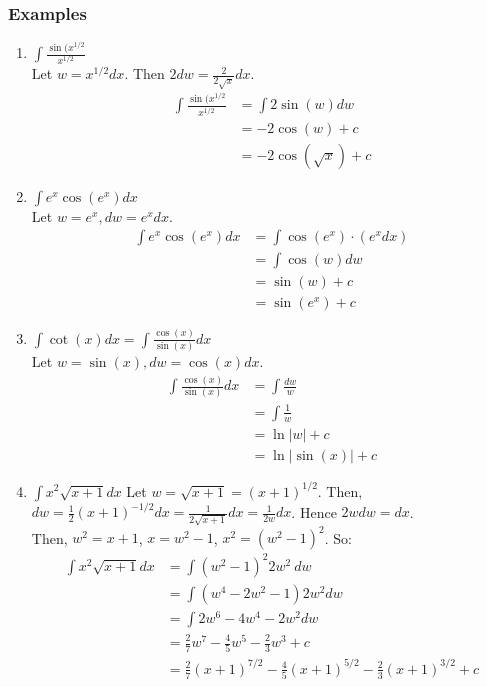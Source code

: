 \documentclass{article}
\begin{document}
\subsubsection{Examples}
\begin{enumerate}
    \item $\int \frac{\sin(x^{1/2}}{x^{1/2}}$\\
    Let $w = x^{1/2} dx$. Then $2dw = \frac{2}{2\sqrt{x}} dx$.
    \begin{align*}
        \int \frac{\sin(x^{1/2}}{x^{1/2}} & = \int 2 \sin(w) dw\\
        & = -2 \cos(w) + c\\
        & = -2 \cos(\sqrt{x}) + c
    \end{align*}
    
    \item $\int e^x \cos(e^x) dx$\\
    Let $w = e^x, dw = e^x dx$.
    \begin{align*}
        \int e^x \cos(e^x) dx & = \int \cos(e^x) \cdot (e^x dx)\\
        & = \int \cos(w) dw\\
        & = \sin(w) + c\\
        & = \sin(e^x) + c
    \end{align*}
    
    \item $\int \cot(x) dx = \int \frac{\cos(x)}{\sin(x)} dx$\\
    Let $w = \sin(x), dw = \cos(x) dx$.
    \begin{align*}
        \int \frac{\cos(x)}{\sin(x)} dx & = \int \frac{dw}{w}\\
        & = \int \frac{1}{w}\\
        & = \ln|w| +c\\
        & = \ln|\sin(x)| +c
    \end{align*}
    
    \item $\int x^2\sqrt{x + 1} dx$
    Let $w = \sqrt{x + 1} = (x+1)^{1/2}$. Then, $dw = \frac{1}{2}(x+1)^{-1/2} dx = \frac{1}{2\sqrt{x+1}} dx = \frac{1}{2w} dx$. Hence $2wdw = dx$.\\
    Then, $w^2 = x + 1$, $x = w^2 -1$, $x^2 = (w^2 -1)^2$. So:
    \begin{align*}
        \int x^2\sqrt{x + 1} dx & = \int (w^2-1)^2 2w^2 \ dw\\
        & = \int (w^4 - 2w^2 - 1)2w^2 dw\\
        & = \int 2w^6 -4w^4 - 2w^2 dw\\
        & = \frac{2}{7}w^7 - \frac{4}{5}w^5 - \frac{2}{3}w^3 + c\\
        & = \frac{2}{7}(x+1)^{7/2} - \frac{4}{5}(x+1)^{5/2} - \frac{2}{3}(x+1)^{3/2} + c
    \end{align*}


\end{enumerate}
\end{document}
